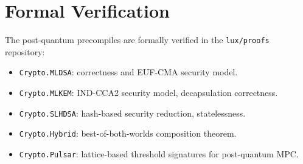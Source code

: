 \section{Formal Verification}

\label{sec:formal}

The post-quantum precompiles are formally verified in the
\texttt{lux/proofs} repository:

\begin{itemize}[nosep]
  \item \texttt{Crypto.MLDSA}: correctness and EUF-CMA security model.
  \item \texttt{Crypto.MLKEM}: IND-CCA2 security model, decapsulation
        correctness.
  \item \texttt{Crypto.SLHDSA}: hash-based security reduction,
        statelessness.
  \item \texttt{Crypto.Hybrid}: best-of-both-worlds composition
        theorem.
  \item \texttt{Crypto.Pulsar}: lattice-based threshold signatures
        for post-quantum MPC.
\end{itemize}

